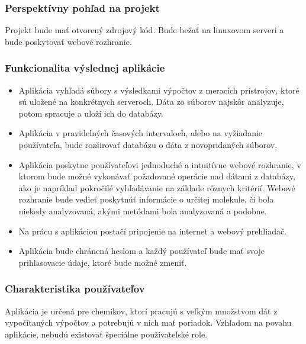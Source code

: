 \documentclass[12pt,a4paper]{article}
\begin{document}
\subsubsection{Perspektívny pohľad na projekt}
Projekt bude mať otvorený zdrojový kód. Bude bežať na linuxovom serveri a bude poskytovať webové rozhranie.

\subsubsection{Funkcionalita výslednej aplikácie}
\begin{itemize}
	\item Aplikácia vyhľadá súbory s výsledkami výpočtov z meracích prístrojov, ktoré sú uložené na konkrétnych serveroch. Dáta zo súborov najskôr analyzuje, potom spracuje a uloží ich do databázy.
	\item Aplikácia v pravidelných časových intervaloch, alebo na vyžiadanie používateľa, bude rozširovať databázu o dáta z novopridaných súborov.
	\item Aplikácia poskytne používateľovi jednoduché a intuitívne webové rozhranie, v ktorom bude možné vykonávať požadované operácie nad dátami z databázy, ako je napríklad pokročilé vyhľadávanie na základe rôznych kritérií. Webové rozhranie bude vedieť poskytnúť informácie o určitej molekule, či bola niekedy analyzovaná, akými metódami bola analyzovaná a podobne.
	\item Na prácu s aplikáciou postačí pripojenie na internet a webový prehliadač.
	\item Aplikácia bude chránená heslom a každý používateľ bude mať svoje prihlasovacie údaje, ktoré bude možné zmeniť.
\end{itemize}

\subsubsection{Charakteristika používateľov}
Aplikácia je určená pre chemikov, ktorí pracujú s veľkým množstvom dát
z vypočítaných výpočtov a potrebujú v nich mať poriadok. Vzhľadom na
povahu aplikácie, nebudú existovať špeciálne používateľské role.
\end{document}
